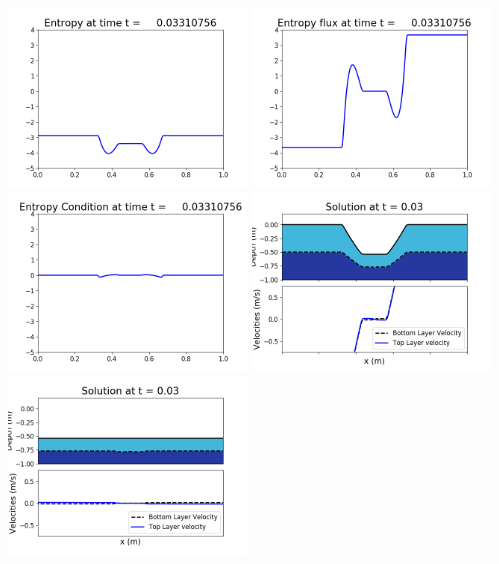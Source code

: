 \documentclass[11pt]{article}
\begin{document}
\vskip 10pt 
\includegraphics[width=0.475\textwidth]{frame0095fig1007.png}
\includegraphics[width=0.475\textwidth]{frame0095fig1008.png}
\vskip 10pt 
\includegraphics[width=0.475\textwidth]{frame0095fig1009.png}
\vskip 10pt 
\includegraphics[width=0.475\textwidth]{frame0096fig1001.png}
\includegraphics[width=0.475\textwidth]{frame0096fig1002.png}
\end{document}
